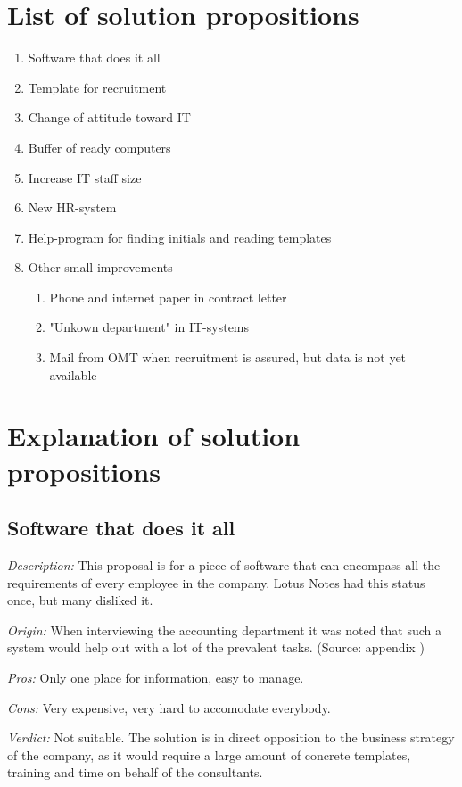 \label{app:solution_propositions}
\section{List of solution propositions}
\begin{enumerate}
\item Software that does it all
\item Template for recruitment
\item Change of attitude toward IT
\item Buffer of ready computers
\item Increase IT staff size
\item New HR-system
\item Help-program for finding initials and reading templates
	\item Other small improvements
	\begin{enumerate}
	\item Phone and internet paper in contract letter
	\item "Unkown department" in IT-systems
	\item Mail from OMT when recruitment is assured, but data is not yet available
	\end{enumerate}
\end{enumerate}

\section{Explanation of solution propositions}
\subsection{Software that does it all}
\emph{Description:} This proposal is for a piece of software that can encompass all the requirements of every employee in the company. Lotus Notes had this status once, but many disliked it.

\emph{Origin:}
When interviewing the accounting department it was noted that such a system would help out with a lot of the prevalent tasks.
(Source: appendix )

\noindent \emph{Pros:} Only one place for information, easy to manage.

\noindent \emph{Cons:} Very expensive, very hard to accomodate everybody.

\emph {Verdict:}
Not suitable. The solution is in direct opposition to the business strategy of the company, as it would require a large amount of concrete templates, training and time on behalf of the consultants.

